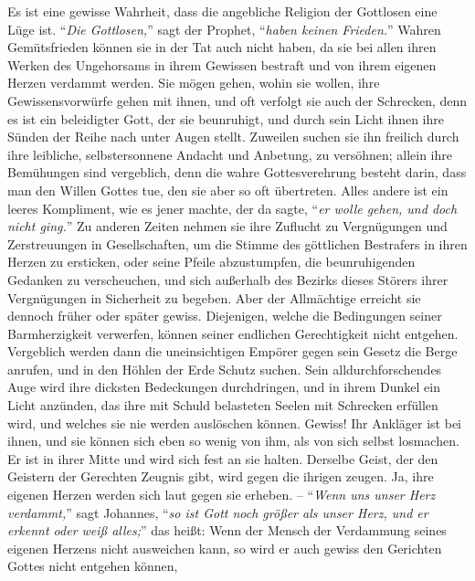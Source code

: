 Es ist eine gewisse Wahrheit, dass die angebliche Religion der Gottlosen eine Lüge
ist.
"`\textit{Die Gottlosen,}"' sagt der Prophet, "`\textit{haben keinen Frieden.}"'
Wahren Gemütsfrieden können sie in der Tat auch nicht haben, da sie bei allen
ihren Werken des Ungehorsams in ihrem Gewissen bestraft und von ihrem eigenen
Herzen verdammt werden.
Sie mögen gehen, wohin sie wollen, ihre Gewissensvorwürfe gehen mit ihnen, und
oft verfolgt sie auch der Schrecken,
denn es ist ein beleidigter Gott, der sie beunruhigt, und durch sein Licht ihnen
ihre Sünden der Reihe nach unter Augen stellt.
Zuweilen suchen sie ihn freilich durch ihre leibliche, selbstersonnene Andacht
und Anbetung, zu versöhnen;
allein ihre Bemühungen sind vergeblich,
denn die wahre Gottesverehrung besteht darin, dass man den Willen Gottes tue,
den sie aber so oft übertreten.
Alles andere ist ein leeres Kompliment, wie es jener machte, der da sagte,
"`\textit{er wolle gehen, und doch nicht ging.}"'
Zu anderen Zeiten nehmen sie ihre Zuflucht zu Vergnügungen und Zerstreuungen in
Gesellschaften, um die Stimme des göttlichen Bestrafers in ihren Herzen zu
ersticken, oder seine Pfeile abzustumpfen, die beunruhigenden Gedanken zu
verscheuchen, und sich außerhalb des Bezirks dieses Störers ihrer Vergnügungen
in Sicherheit zu begeben.
Aber der Allmächtige erreicht sie dennoch früher oder später gewiss.
Diejenigen, welche die Bedingungen seiner Barmherzigkeit verwerfen, können
seiner endlichen Gerechtigkeit nicht entgehen.
Vergeblich werden dann die uneinsichtigen Empörer gegen sein Gesetz die Berge anrufen, und in
den Höhlen der Erde Schutz suchen.
Sein alldurchforschendes Auge wird ihre dicksten Bedeckungen durchdringen, und
in ihrem Dunkel ein Licht anzünden, das ihre mit Schuld belasteten Seelen mit
Schrecken erfüllen wird, und welches sie nie werden auslöschen können.
Gewiss!
Ihr Ankläger ist bei ihnen, und sie können sich eben so wenig von ihm, als von
sich selbst losmachen.
Er ist in ihrer Mitte und wird sich fest an sie halten.
Derselbe Geist, der den Geistern der Gerechten Zeugnis gibt, wird gegen die
ihrigen zeugen.
Ja, ihre eigenen Herzen werden sich laut gegen sie erheben.
-- "`\textit{Wenn uns unser Herz verdammt,}"' sagt Johannes, "`\textit{so ist
Gott noch größer als unser Herz, und er erkennt oder weiß alles;}"' das heißt:
Wenn der Mensch der Verdammung seines eigenen Herzens nicht ausweichen kann, so
wird er auch gewiss den Gerichten Gottes nicht entgehen können,

